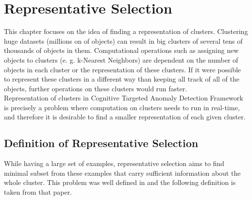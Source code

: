 \documentclass[thesis=B,english]{FITthesis}[2012/10/20]
\begin{document}


\chapter{Representative Selection}
This chapter focuses on the idea of finding a representation of clusters.
Clustering huge datasets (millions on of objects) can result in big clusters of several tens of thousands of objects in them.
Computational operations such as assigning new objects to clusters (e. g. k-Nearest Neighbors) are dependent on the number of objects in each cluster or the representation of these clusters.
If it were possible to represent these clusters in a different way than keeping all track of all of the objects, further operations on these clusters would run faster. \\

Representation of clusters in Cognitive Targeted Anomaly Detection Framework is precisely a problem where computation on clusters needs to run in real-time, and therefore it is desirable to find a smaller representation of each given cluster.

\section{Definition of Representative Selection}
While having a large set of examples, representative selection aims to find minimal subset from these examples that carry sufficient information about the whole cluster.
This problem was well defined in \cite{liebman2015representative} and the following definition is taken from that paper. \\
\end{document}
